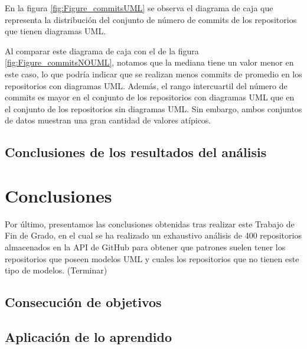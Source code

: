 \documentclass[a4paper, 12pt]{book}
\begin{document}
En la figura \ref{fig:Figure_commitsUML} se observa el diagrama de caja que representa la distribución del conjunto de número de commits de los repositorios que tienen diagramas UML.


Al comparar este diagrama de caja con el de la figura \ref{fig:Figure_commitsNOUML}, notamos que la mediana tiene un valor menor en este caso, lo que podría indicar que se realizan menos commits de promedio en los repositorios con diagramas UML. 
Además, el rango intercuartil del número de commits es mayor en el conjunto de los repositorios con diagramas UML que en el conjunto de los repositorios sin diagramas UML.
Sin embargo, ambos conjuntos de datos muestran una gran cantidad de valores atípicos. 



\section{Conclusiones de los resultados del análisis}
\label{sec:conclusiones de los resultados del análisis}




\cleardoublepage
\chapter{Conclusiones}
\label{chap:conclusiones}

Por último, presentamos las conclusiones obtenidas tras realizar este Trabajo de Fin de Grado, en el cual se ha realizado un exhaustivo análisis de 400 repositorios almacenados en la API de GitHub para obtener que patrones suelen tener los repositorios que poseen modelos UML y cuales los repositorios que no tienen este tipo de modelos. 
(Terminar)

\section{Consecución de objetivos}
\label{sec:consecucion-objetivos}



\section{Aplicación de lo aprendido}
\label{sec:aplicacion}
\end{document}
